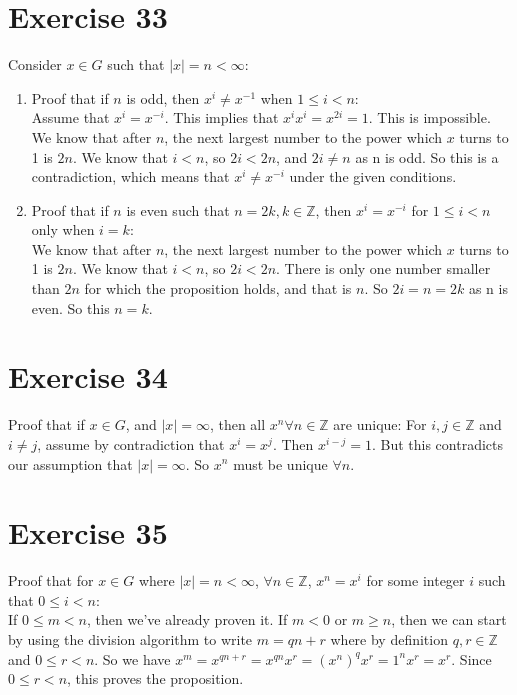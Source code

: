 \documentclass{article}
\newcommand{\Z}{\mathbb{Z}}
\begin{document}
    \section*{Exercise 33}
    Consider $x \in G$ such that $|x| = n < \infty$:
    \begin{enumerate}[label=\textbf{\alph*.}]
        \item 
            Proof that if $n$ is odd,
            then $x^i \neq x^{-1}$ when $1 \leqslant i < n$: \\
            Assume that $x^i = x^{-i}$.
            This implies that $x^ix^i = x^{2i} = 1$.
            This is impossible. We know that after $n$, the next largest
            number to the power which $x$ turns to 1 is $2n$.
            We know that $i < n$,
            so $2i < 2n$,
            and $2i \neq n$ as n is odd.
            So this is a contradiction,
            which means that $x^i \neq x^{-i}$ under the given conditions. 
        \item 
            Proof that if $n$ is even such that $n = 2k, k \in \Z$,
            then $x^i = x^{-i}$ for $1 \leqslant i < n$ only when $i = k$: \\
            We know that after $n$, the next largest number to the power 
            which $x$ turns to 1 is $2n$.
            We know that $i < n$,
            so $2i < 2n$.
            There is only one number smaller than $2n$ for which the
            proposition holds, and that is $n$.
            So $2i = n = 2k$ as n is even.
            So this $n = k$.
    \end{enumerate}


    \section*{Exercise 34}
    Proof that if $x \in G$, and $|x| = \infty$,
    then all $x^n \forall n \in \Z$ are unique:
    For $i, j \in \Z$ and $i \neq j$, 
    assume by contradiction that $x^i = x^j$.
    Then $x^{i - j} = 1$.
    But this contradicts our assumption that $|x| = \infty$.
    So $x^n$ must be unique $\forall n$.


    \section*{Exercise 35}
    Proof that for $x \in G$ where $|x| = n < \infty$,
    $\forall n \in \Z$, $x^n = x^i$ for some integer $i$
    such that $0 \leqslant i < n$: \\
    If $0 \leqslant m < n$, then we've already proven it.
    If $m < 0$ or $m \geqslant n$,
    then we can start by using the division algorithm to write $m = qn + r$
    where by definition $q, r \in \Z$ and $0 \leqslant r < n$.
    So we have $x^m = x^{qn + r} = x^{qn}x^r = (x^n)^qx^r = 1^nx^r = x^r$.
    Since $0 \leqslant r < n$, this proves the proposition.
\end{document}
